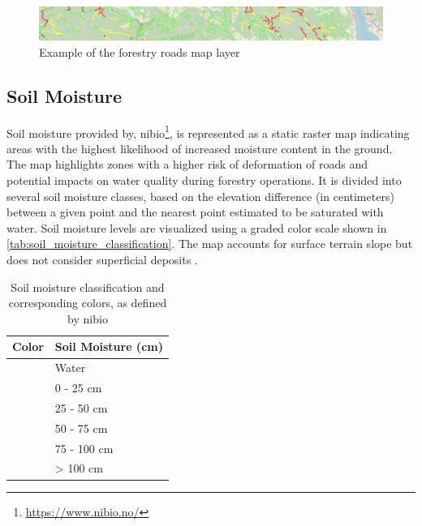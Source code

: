 \begin{figure}[h]
    \centering
    \includegraphics[width=1\linewidth]{images/maplayers/forestryroad.png}
    \caption{Example of the forestry roads map layer}
    \label{fig:maplayer:forestryroads}
\end{figure}

\subsection{Soil Moisture}

Soil moisture provided by, \acrfull{nibio}\footnote{\url{https://www.nibio.no/}}, is represented as a static raster map indicating areas with the highest likelihood of increased moisture content in the ground. The map highlights zones with a higher risk of deformation of roads and potential impacts on water quality during forestry operations. It is divided into several soil moisture classes, based on the elevation difference (in centimeters) between a given point and the nearest point estimated to be saturated with water. Soil moisture levels are visualized using a graded color scale shown in \autoref{tab:soil_moisture_classification}. The map accounts for surface terrain slope but does not consider superficial deposits \cite{geonorge_soil_moisture}.

\begin{table}[h]
    \centering
    \begin{tabular}{|l|l|}
        \hline  
        \textbf{Color} & \textbf{Soil Moisture (cm)} \\
        \hline
        \cellcolor[HTML]{000080} & Water \\
        \hline
        \cellcolor[HTML]{0000ff} & 0 - 25 cm \\
        \hline
        \cellcolor[HTML]{1e90ff} & 25 - 50 cm \\
        \hline
        \cellcolor[HTML]{00bfff} & 50 - 75 cm \\
        \hline
        \cellcolor[HTML]{87cefa} & 75 - 100 cm \\
        \hline
        \cellcolor[HTML]{ffffff} & > 100 cm \\
        \hline
    \end{tabular}
    \caption[Soil moisture classification and corresponding colors]{Soil moisture classification and corresponding colors, as defined by \acrshort{nibio} \cite{geonorge_soil_moisture}}
    \label{tab:soil_moisture_classification}
\end{table}

